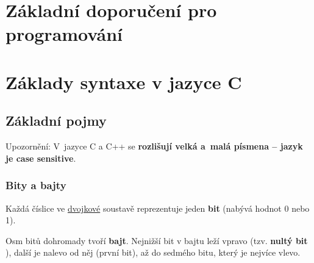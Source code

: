 \section{Základní doporučení pro programování} \label{programovani:zaklady} %

\section{Základy syntaxe v jazyce C}

\subsection{Základní pojmy}

\label{cpp} Upozornění: V~jazyce C a C++ se {\bf rozlišují velká a~malá písmena -- jazyk je case sensitive}.  

\subsubsection{Bity a bajty}

Každá číslice ve \hyperref[dvojkova]{dvojkové} soustavě reprezentuje jeden {\bf bit}  (nabývá hodnot 0 nebo 1). 

Osm bitů dohromady tvoří  {\bf bajt}. 
Nejnižší bit v bajtu leží vpravo (tzv. {\bf nultý bit}   ),  
další je nalevo od něj (první bit), až do sedmého bitu, který je nejvíce vlevo.

